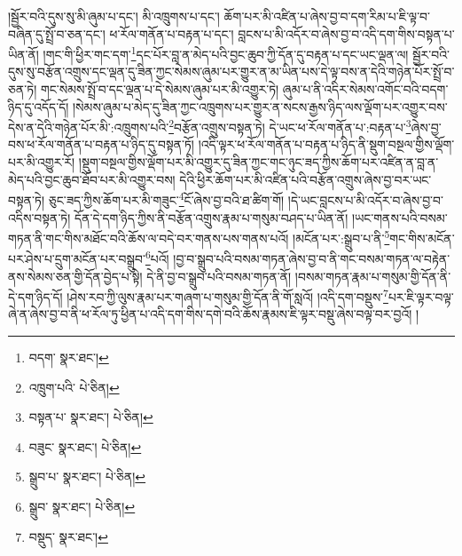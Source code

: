 །སྦྱོར་བའི་དུས་སུ་མི་ཞུམ་པ་དང་། མི་འཁྲུགས་པ་དང་། ཆོག་པར་མི་འཛིན་པ་ཞེས་བྱ་བ་དག་རིམ་པ་ཇི་ལྟ་བ་བཞིན་དུ་སྤྲོ་བ་ཅན་དང་། ཕ་རོལ་གནོན་པ་བརྟན་པ་དང་། བླངས་པ་མི་འདོར་བ་ཞེས་བྱ་བ་འདི་དག་གིས་བསྟན་པ་ཡིན་ནོ། །གང་གི་ཕྱིར་གང་དག་\footnote{བདག་  སྣར་ཐང་། }དང་པོར་བླ་ན་མེད་པའི་བྱང་ཆུབ་ཀྱི་དོན་དུ་བརྟན་པ་དང་ཡང་ལྡན་ལ། སྦྱོར་བའི་དུས་སུ་བརྩོན་འགྲུས་དང་ལྡན་དུ་ཟིན་ཀྱང་སེམས་ཞུམ་པར་གྱུར་ན་མ་ཡིན་པས་དེ་ལྟ་བས་ན་དེའི་གཉེན་པོར་སྤྲོ་བ་ཅན་ཏེ། གང་སེམས་སྤྲོ་བ་དང་ལྡན་པ་དེ་སེམས་ཞུམ་པར་མི་འགྱུར་ཏེ། ཞུམ་པ་ནི་འདིར་སེམས་འགོང་བའི་བདག་ཉིད་དུ་འདོད་དོ། །སེམས་ཞུམ་པ་མེད་དུ་ཟིན་ཀྱང་འཁྲུགས་པར་གྱུར་ན་སངས་རྒྱས་ཉིད་ལས་ལྡོག་པར་འགྱུར་བས་དེས་ན་དེའི་གཉེན་པོར་མི་:འཁྲུགས་པའི་\footnote{འཁྲུག་པའི་  པེ་ཅིན། }བརྩོན་འགྲུས་བསྟན་ཏེ། དེ་ཡང་ཕ་རོལ་གནོན་པ་:བརྟན་པ་\footnote{བསྟན་པ་  སྣར་ཐང་།  པེ་ཅིན། }ཞེས་བྱ་བས་ཕ་རོལ་གནོན་པ་བརྟན་པ་ཉིད་དུ་བསྟན་ཏོ། །འདི་ལྟར་ཕ་རོལ་གནོན་པ་བརྟན་པ་ཉིད་ནི་སྡུག་བསྔལ་གྱིས་ལྡོག་པར་མི་འགྱུར་རོ། །སྡུག་བསྔལ་གྱིས་ལྡོག་པར་མི་འགྱུར་དུ་ཟིན་ཀྱང་གང་ཉུང་ཟད་ཀྱིས་ཆོག་པར་འཛིན་ན་བླ་ན་མེད་པའི་བྱང་ཆུབ་ཐོབ་པར་མི་འགྱུར་བས། དེའི་ཕྱིར་ཆོག་པར་མི་འཛིན་པའི་བརྩོན་འགྲུས་ཞེས་བྱ་བར་ཡང་བསྟན་ཏེ། ཅུང་ཟད་ཀྱིས་ཆོག་པར་མི་གཟུང་\footnote{བཟུང་  སྣར་ཐང་།  པེ་ཅིན། }ངོ་ཞེས་བྱ་བའི་ཐ་ཚིག་གོ། །དེ་ཡང་བླངས་པ་མི་འདོར་བ་ཞེས་བྱ་བ་འདིས་བསྟན་ཏེ། དོན་དེ་དག་ཉིད་ཀྱིས་ནི་བརྩོན་འགྲུས་རྣམ་པ་གསུམ་བཤད་པ་ཡིན་ནོ། །ཡང་གནས་པའི་བསམ་གཏན་ནི་གང་གིས་མཐོང་བའི་ཆོས་ལ་བདེ་བར་གནས་པས་གནས་པའོ། །མངོན་པར་:སྒྲུབ་པ་ནི་\footnote{སྒྲུབ་པ་  སྣར་ཐང་།  པེ་ཅིན། }གང་གིས་མངོན་པར་ཤེས་པ་དྲུག་མངོན་པར་བསྒྲུབ་\footnote{སྒྲུབ་  སྣར་ཐང་།  པེ་ཅིན། }པའོ། །བྱ་བ་སྒྲུབ་པའི་བསམ་གཏན་ཞེས་བྱ་བ་ནི་གང་བསམ་གཏན་ལ་བརྟེན་ནས་སེམས་ཅན་གྱི་དོན་བྱེད་པ་སྟེ། དེ་ནི་བྱ་བ་སྒྲུབ་པའི་བསམ་གཏན་ནོ། །བསམ་གཏན་རྣམ་པ་གསུམ་གྱི་དོན་ནི་དེ་དག་ཉིད་དོ། །ཤེས་རབ་ཀྱི་ལུས་རྣམ་པར་གཞག་པ་གསུམ་གྱི་དོན་ནི་གོ་སླའོ། །འདི་དག་བསྡུས་\footnote{བསྡུད་  སྣར་ཐང་། }པར་ཇི་ལྟར་བལྟ་ཞེ་ན་ཞེས་བྱ་བ་ནི་ཕ་རོལ་ཏུ་ཕྱིན་པ་འདི་དག་གིས་དགེ་བའི་ཆོས་རྣམས་ཇི་ལྟར་བསྡུ་ཞེས་བལྟ་བར་བྱའོ། །
